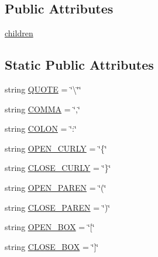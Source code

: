 \subsection*{Public Attributes}
\begin{DoxyCompactItemize}
\item 
\hyperlink{classbridges_1_1tree__element_1_1_tree_element_a09e0e8ad32395e004b6b2d12c39ce390}{children}
\end{DoxyCompactItemize}
\subsection*{Static Public Attributes}
\begin{DoxyCompactItemize}
\item 
string \hyperlink{classbridges_1_1tree__element_1_1_tree_element_aa5a4d14f38ceb896a85ef0b703d6995a}{Q\+U\+O\+TE} = \char`\"{}\textbackslash{}\char`\"{}\char`\"{}
\item 
string \hyperlink{classbridges_1_1tree__element_1_1_tree_element_a427a0eaaae4cf421dc0353ca8f4047d2}{C\+O\+M\+MA} = \char`\"{},\char`\"{}
\item 
string \hyperlink{classbridges_1_1tree__element_1_1_tree_element_a1ece84d898aec2a9340f45e52ace2313}{C\+O\+L\+ON} = \char`\"{}\+:\char`\"{}
\item 
string \hyperlink{classbridges_1_1tree__element_1_1_tree_element_abff31b93e3dfe4c3089d3a14abeede86}{O\+P\+E\+N\+\_\+\+C\+U\+R\+LY} = \char`\"{}\{\char`\"{}
\item 
string \hyperlink{classbridges_1_1tree__element_1_1_tree_element_a30e6828805446c2c86423c334c81c981}{C\+L\+O\+S\+E\+\_\+\+C\+U\+R\+LY} = \char`\"{}\}\char`\"{}
\item 
string \hyperlink{classbridges_1_1tree__element_1_1_tree_element_a09d8d27767e40f3b84a8395123cfa15a}{O\+P\+E\+N\+\_\+\+P\+A\+R\+EN} = \char`\"{}(\char`\"{}
\item 
string \hyperlink{classbridges_1_1tree__element_1_1_tree_element_ae6264b1611ca448a64e3ef3ac4baf8da}{C\+L\+O\+S\+E\+\_\+\+P\+A\+R\+EN} = \char`\"{})\char`\"{}
\item 
string \hyperlink{classbridges_1_1tree__element_1_1_tree_element_a61cd10ef5adf34b1aa56a6be855fb2c9}{O\+P\+E\+N\+\_\+\+B\+OX} = \char`\"{}\mbox{[}\char`\"{}
\item 
string \hyperlink{classbridges_1_1tree__element_1_1_tree_element_a35214b444048a585452a8451cd23c802}{C\+L\+O\+S\+E\+\_\+\+B\+OX} = \char`\"{}\mbox{]}\char`\"{}
\end{DoxyCompactItemize}


